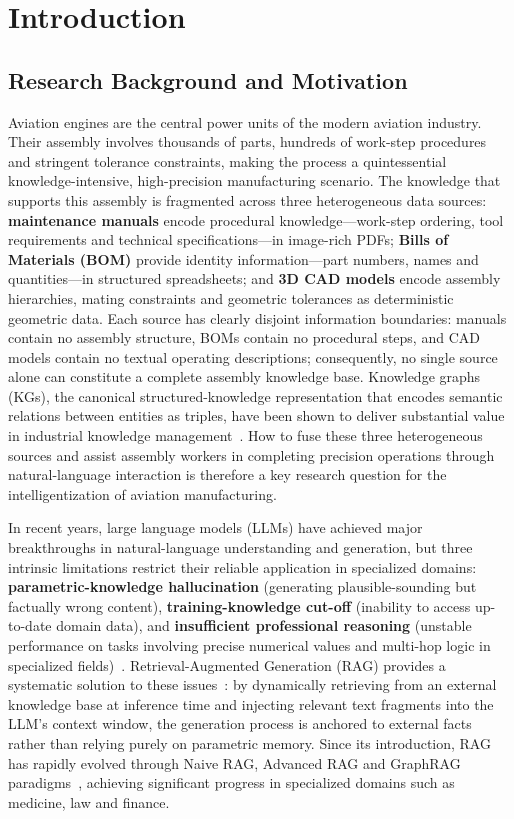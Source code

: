 \documentclass[applsci,article,submit,pdftex,moreauthors]{Definitions/mdpi}
\begin{document}
\section{Introduction}
\label{sec:intro}

\subsection{Research Background and Motivation}
\label{sec:background}

Aviation engines are the central power units of the modern aviation industry. Their assembly involves thousands of parts, hundreds of work-step procedures and stringent tolerance constraints, making the process a quintessential knowledge-intensive, high-precision manufacturing scenario. The knowledge that supports this assembly is fragmented across three heterogeneous data sources: \textbf{maintenance manuals} encode procedural knowledge---work-step ordering, tool requirements and technical specifications---in image-rich PDFs; \textbf{Bills of Materials (BOM)} provide identity information---part numbers, names and quantities---in structured spreadsheets; and \textbf{3D CAD models} encode assembly hierarchies, mating constraints and geometric tolerances as deterministic geometric data. Each source has clearly disjoint information boundaries: manuals contain no assembly structure, BOMs contain no procedural steps, and CAD models contain no textual operating descriptions; consequently, no single source alone can constitute a complete assembly knowledge base. Knowledge graphs (KGs), the canonical structured-knowledge representation that encodes semantic relations between entities as triples, have been shown to deliver substantial value in industrial knowledge management~\citep{hogan2021kg,ji2022kgsurvey}. How to fuse these three heterogeneous sources and assist assembly workers in completing precision operations through natural-language interaction is therefore a key research question for the intelligentization of aviation manufacturing.

In recent years, large language models (LLMs) have achieved major breakthroughs in natural-language understanding and generation, but three intrinsic limitations restrict their reliable application in specialized domains: \textbf{parametric-knowledge hallucination} (generating plausible-sounding but factually wrong content), \textbf{training-knowledge cut-off} (inability to access up-to-date domain data), and \textbf{insufficient professional reasoning} (unstable performance on tasks involving precise numerical values and multi-hop logic in specialized fields)~\citep{zhao2023llmsurvey}. Retrieval-Augmented Generation (RAG) provides a systematic solution to these issues~\citep{lewis2020rag}: by dynamically retrieving from an external knowledge base at inference time and injecting relevant text fragments into the LLM's context window, the generation process is anchored to external facts rather than relying purely on parametric memory. Since its introduction, RAG has rapidly evolved through Naive RAG, Advanced RAG and GraphRAG paradigms~\citep{gao2023ragsurvey}, achieving significant progress in specialized domains such as medicine, law and finance.
\end{document}
